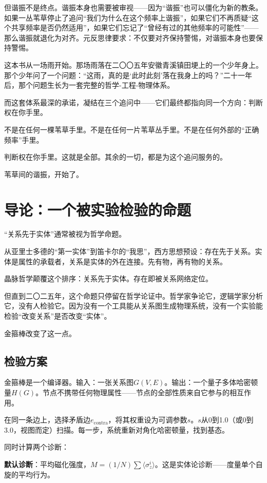 \documentclass[11pt,a4paper]{book}
\theoremstyle{definition}
\begin{document}
但谐振不是终点。谐振本身也需要被审视——因为“谐振”也可以僵化为新的教条。如果一丛苇草停止了追问“我们为什么在这个频率上谐振”，如果它们不再质疑“这个共享频率是否仍然适用”，如果它们忘记了“曾经有过的其他频率的可能性”——那么谐振就退化为对齐。元反思律要求：不仅要对齐保持警惕，对谐振本身也要保持警惕。

这本书从一场雨开始。那场雨落在二〇〇五年安徽青溪镇田埂上的一个少年身上。那个少年问了一个问题：“这雨，真的是‘此时此刻’落在我身上的吗？”二十一年后，那个问题生长为一套完整的哲学-工程-物理体系。

而这套体系最深的承诺，凝结在三个追问中——它们最终都指向同一个方向：判断权在你手里。

不是在任何一棵苇草手里。不是在任何一片苇草丛手里。不是在任何外部的“正确频率”手里。

判断权在你手里。这就是全部。其余的一切，都是为这个追问服务的。

苇草间的谐振，开始了。

\chapter*{导论：一个被实验检验的命题}

“关系先于实体”通常被视为哲学命题。

从亚里士多德的“第一实体”到笛卡尔的“我思”，西方思想预设：存在先于关系。实体是属性的承载者，关系是实体的外在连接。先有物，再有物的关系。

晶脉哲学颠覆这个排序：关系先于实体。存在即被关系网络定位。

但直到二〇二五年，这个命题只停留在哲学论证中。哲学家争论它，逻辑学家分析它，没有人检验它。因为没有一个工具能从关系图生成物理系统，没有一个实验能检验“改变关系”是否改变“实体”。

金箍棒改变了这一点。

\section*{检验方案}

金箍棒是一个编译器。输入：一张关系图$G(V,E)$。输出：一个量子多体哈密顿量$H(G)$。节点不携带任何物理属性——节点的全部性质来自它参与的相互作用。

在同一条边上，选择矛盾边$e_{\text{contra}}$，将其权重设为可调参数$s$。$s$从0到1.0（或0到3.0，视图而定）扫描。每一步，系统重新对角化哈密顿量，找到基态。

同时计算两个诊断：

\textbf{默认诊断}：平均磁化强度，$M = (1/N)\sum\langle\sigma_z^i\rangle$。这是实体论诊断——度量单个自旋的平均行为。
\end{document}
